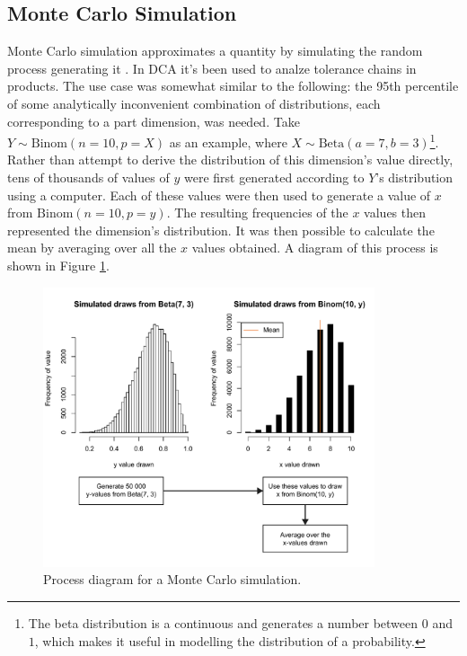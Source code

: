 \documentclass[11pt,a4paper,article]{memoir} %
\begin{document}
\newpage
\subsection*{Monte Carlo Simulation}
Monte Carlo simulation approximates a quantity by simulating the random process generating it . In DCA it's been used to analze tolerance chains in products. The use case was somewhat similar to the following: the 95th percentile of some analytically inconvenient combination of distributions, each corresponding to a part dimension, was needed. Take $Y \sim \text{Binom}(n = 10, p = X)$ as an example, where $X \sim \text{Beta}(a = 7, b = 3)$\footnote{The beta distribution is a continuous and generates a number between $0$ and $1$, which makes it useful in modelling the distribution of a probability.}. Rather than attempt to derive the distribution of this dimension's value directly, tens of thousands of values of $y$ were first generated according to $Y$'s distribution using a computer. Each of these values were then used to generate a value of $x$ from $\text{Binom}(n = 10, p = y)$. The resulting frequencies of the $x$ values then represented the dimension's distribution. It was then possible to calculate the mean by averaging over all the $x$ values obtained. A diagram of this process is shown in Figure \ref{fig:monte_carlo}.
\begin{figure}[b!]
\includegraphics[width=0.87\textwidth]{monte_carlo_simulation.pdf}
\caption{Process diagram for a Monte Carlo simulation.}
\label{fig:monte_carlo}
\end{figure}


\newpage
\end{document}
